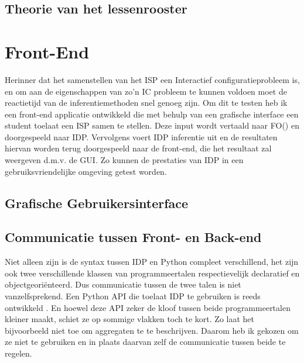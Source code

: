 \subsection{Theorie van het lessenrooster}



\section{Front-End}
Herinner dat het samenstellen van het ISP een Interactief configuratieprobleem is, en om aan de eigenschappen van zo'n IC probleem te kunnen voldoen moet de reactietijd van de inferentiemethoden snel genoeg zijn. Om dit te testen heb ik een front-end applicatie ontwikkeld die met behulp van een grafische interface een student toelaat een ISP samen te stellen. Deze input wordt vertaald naar FO(\textperiodcentered) en doorgespeeld naar IDP. Vervolgens voert IDP inferentie uit en de resultaten hiervan worden terug doorgespeeld naar de front-end, die het resultaat zal weergeven d.m.v. de GUI. Zo kunnen de prestaties van IDP in een gebruiksvriendelijke omgeving getest worden. 

\subsection{Grafische Gebruikersinterface}



\subsection{Communicatie tussen Front- en Back-end}
Niet alleen zijn is de syntax tussen IDP en Python compleet verschillend, het zijn ook twee verschillende klassen van programmeertalen respectievelijk declaratief en objectgeori\"{e}nteerd. Dus communicatie tussen de twee talen is niet vanzelfsprekend. Een Python API die toelaat IDP te gebruiken is reeds ontwikkeld \citep{vennekens2015lowering}. En hoewel deze API zeker de kloof tussen beide programmeertalen kleiner maakt, schiet ze op sommige vlakken toch te kort. Zo laat het bijvoorbeeld niet toe om aggregaten te te beschrijven. Daarom heb ik gekozen om ze niet te gebruiken en in plaats daarvan zelf de communicatie tussen beide te regelen. 

